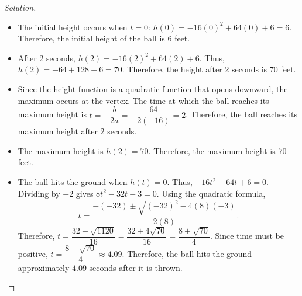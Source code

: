 \documentclass[12pt]{article}
\newenvironment{solution}{\begin{proof}[Solution]}{\end{proof}}
\begin{document}
\begin{enumerate}
		\begin{solution}
			\begin{itemize}
				\item[(a)] The initial height occurs when $t=0$: $ h(0)=-16(0)^2+64(0)+6=6$. Therefore, the initial height of the ball is $6$ feet. 
				\item[(b)] After 2 seconds, $h(2)=-16(2)^2+64(2)+6$. Thus, $h(2)=-64+128+6=70$. Therefore, the height after 2 seconds is $70$ feet. 
				\item[(c)] Since the height function is a quadratic function that opens downward, the maximum occurs at the vertex. The time at which the ball reaches its maximum height is $t=-\dfrac{b}{2a} =-\dfrac{64}{2(-16)} =2$. Therefore, the ball reaches its maximum height after $2$ seconds. 
				\item[(d)] The maximum height is $h(2)=70.$ Therefore, the maximum height is $70$ feet. 
				\item[(e)] The ball hits the ground when $h(t)=0$. Thus, $-16t^2+64t+6=0$. Dividing by $-2$ gives $8t^2-32t-3=0$. Using the quadratic formula, $$ t=\dfrac{-(-32)\pm\sqrt{(-32)^2-4(8)(-3)}}{2(8)}. $$ Therefore, $t=\dfrac{32\pm\sqrt{1120}}{16} =\dfrac{32\pm4\sqrt{70}}{16} =\dfrac{8\pm\sqrt{70}}{4}$. Since time must be positive, $t=\dfrac{8+\sqrt{70}}{4}\approx4.09.$ Therefore, the ball hits the ground approximately $4.09$ seconds after it is thrown.
			\end{itemize}
		\end{solution}
		
	\end{enumerate}
	
	
	
	
	\newpage
	
\end{document}
